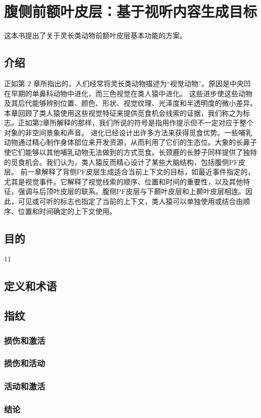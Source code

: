 \chapter{腹侧前额叶皮层：基于视听内容生成目标}
这本书提出了关于灵长类动物前额叶皮层基本功能的方案。

\section{介绍}
正如第 2 章所指出的，人们经常将灵长类动物描述为“视觉动物”。原因是中央凹在早期的单鼻科动物中进化，而三色视觉在类人猿中进化。 这些进步使这些动物及其后代能够辨别位置、颜色、形状、视觉纹理、光泽度和半透明度的微小差异。本章回顾了类人猿使用这些视觉特征来提供觅食机会线索的证据，我们称之为标志。正如第2章所解释的那样，我们所说的符号是指用作提示但不一定对应于整个对象的非空间景象和声音。
进化已经设计出许多方法来获得觅食优势。一些哺乳动物通过精心制作身体部位来开发资源，从而利用了它们的生态位。大象的长鼻子使它们能够以其他哺乳动物无法做到的方式觅食。长颈鹿的长脖子同样提供了独特的觅食机会。我们认为，类人猿反而精心设计了某些大脑结构，包括腹侧PF皮层。
前一章解释了背侧PF皮层生成适合当前上下文的目标，如最近事件指定的，尤其是视觉事件。它解释了视觉线索的顺序、位置和时间的重要性，以及其他特征，强调与后顶叶皮层的联系。腹侧PF皮层与下颞叶皮层和上颞叶皮层相连。因此，可见或可听的标志也指定了当前的上下文，类人猿可以单独使用或结合由顺序、位置和时间确定的上下文使用。
\section{目的}
11
\section{定义和术语}


\section{指纹}

\subsection{损伤和激活}

\subsection{损伤和活动}

\subsection{活动和激活}




\subsection{结论}


